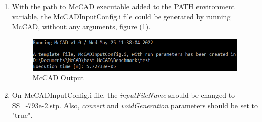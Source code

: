 \documentclass[12pt, a4paper, titlepage]{article}
\begin{document}
\begin{enumerate}
  \item With the path to McCAD executable added to the PATH environment variable, the McCADInputConfig.i file could be generated by running McCAD, without any arguments, figure (\ref{fig:McCAD_output}).
  \begin{figure}[h!]
  	\centering
  	\includegraphics[scale=0.75]{figures/McCAD_output.png}
  	\caption{McCAD Output}
  	\label{fig:McCAD_output}
  \end{figure}

  \item On McCADInputConfig.i file, the \emph{inputFileName} should be changed to SS\_-793e-2.stp. Also, \emph{convert} and \emph{voidGeneration} parameters should be set to "true".
  

\end{enumerate}
\end{document}
